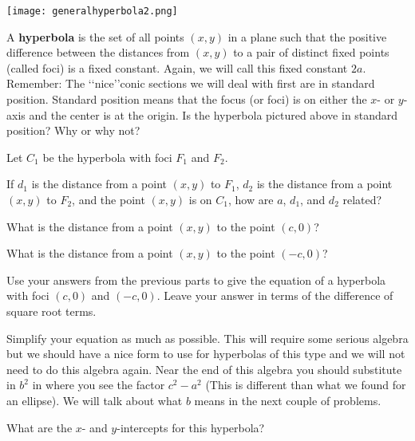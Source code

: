 \begin{center} \texttt{[image: generalhyperbola2.png]} \end{center}

\begin{info} A \textbf{hyperbola} is the set of all points $(x,y)$ in a plane such that the positive difference  between the distances from $(x,y)$ to a pair of distinct fixed points (called foci) is a fixed constant. Again, we will call this fixed constant $2a$.
Remember:  The \lq\lq nice\rq\rq conic sections we will deal with first are in standard position.
Standard position means that the focus (or foci) is on either the $x$- or $y$-axis and the center is at the origin. Is the hyperbola pictured above in standard position? Why or why not?
\end{info}

\bq \label{q61} Let $C_1$ be the hyperbola with foci $F_1$ and $F_2$.
\be
\item If $d_1$ is the distance from a point $(x,y)$ to $F_1$, $d_2$ is the distance from a point $(x,y)$ to $F_2$, and the point $(x,y)$ is on $C_1$, how are $a$, $d_1$, and $d_2$ related?
\item What is the distance from a point $(x,y)$ to the point $(c,0)$?
\item What is the distance from a point $(x,y)$ to the point $(-c,0)$?
\item Use your answers from the previous parts to give the equation of a hyperbola with foci $(c,0)$ and $(-c,0)$. Leave your answer in terms of the difference of square root terms.
\item Simplify your equation as much as possible. This will require some serious algebra but we should have a nice form to use for hyperbolas of this type and we will not need to do this algebra again. Near the end of this algebra you should substitute in $b^2$ in where you see the factor $c^2-a^2$ (This is different than what we found for an ellipse). We will talk about what $b$ means in the next couple of problems.
\item What are the $x$- and $y$-intercepts for this hyperbola?
\ee \eq

\begin{annotation}
\end{annotation}

